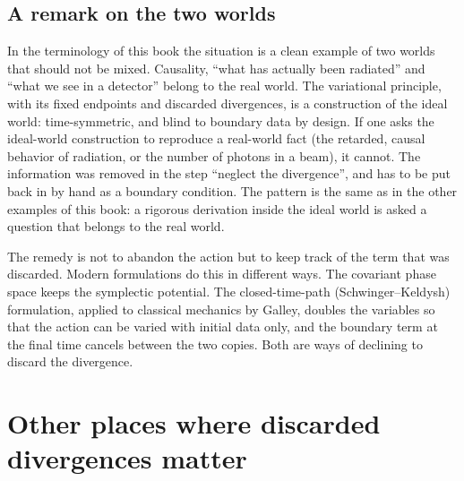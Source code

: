 \subsection*{A remark on the two worlds}

In the terminology of this book the situation is a clean example of two
worlds that should not be mixed. Causality, ``what has actually been
radiated'' and ``what we see in a detector'' belong to the real world. The
variational principle, with its fixed endpoints and discarded divergences,
is a construction of the ideal world: time-symmetric, and blind to
boundary data by design. If one asks the ideal-world construction to
reproduce a real-world fact (the retarded, causal behavior of radiation, or
the number of photons in a beam), it cannot. The information was removed in
the step ``neglect the divergence'', and has to be put back in by hand as a
boundary condition. The pattern is the same as in the other examples of this book: a
rigorous derivation inside the ideal world is asked a question that belongs
to the real world.

The remedy is not to abandon the action but to keep track of the term
that was discarded. Modern formulations do this in different ways. The
covariant phase space keeps the symplectic potential. The closed-time-path
(Schwinger--Keldysh) formulation, applied to classical mechanics by Galley,
doubles the variables so that the action can be varied with initial data
only, and the boundary term at the final time cancels between the two
copies. Both are ways of declining to discard the divergence.

\section[Other discarded divergences]{Other places where discarded divergences matter}
\label{sec:mb-others}

